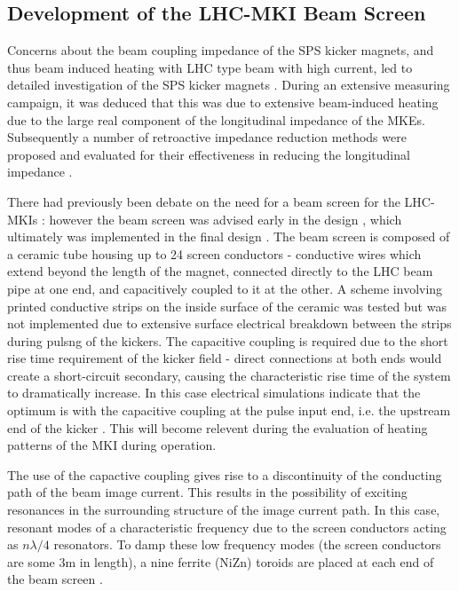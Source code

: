 \subsection{Development of the LHC-MKI Beam Screen}
\label{sec:mki-screen-development}

Concerns about the beam coupling impedance of the SPS kicker magnets, and thus beam induced heating with LHC type beam with high current, led to detailed investigation of the SPS kicker magnets \cite{Arduini:beamInducedSPS}. During an extensive measuring campaign, it was deduced that this was due to extensive beam-induced heating due to the large real component of the longitudinal impedance of the MKEs. Subsequently a number of retroactive impedance reduction methods were proposed and evaluated for their effectiveness in reducing the longitudinal impedance \cite{Kroyer:MKEReduct}.

There had previously been debate on the need for a beam screen for the LHC-MKIs \cite{Vos:beamScreen}: however the beam screen was advised early in the design \cite{Ducimetiere:designMKI}, which ultimately was implemented in the final design \cite{Barnes:improvBeamScreen}. The beam screen is composed of a ceramic tube housing up to 24 screen conductors - conductive wires which extend beyond the length of the magnet, connected directly to the LHC beam pipe at one end, and capacitively coupled to it at the other. A scheme involving printed conductive strips on the inside surface of the ceramic was tested but was not implemented due to extensive surface electrical breakdown between the strips during pulsng of the kickers. The capacitive coupling is required due to the short rise time requirement of the kicker field - direct connections at both ends would create a short-circuit secondary, causing the characteristic rise time of the system to dramatically increase. In this case electrical simulations indicate that the optimum is with the capacitive coupling at the pulse input end, i.e. the upstream end of the kicker \cite{Barnes:improvBeamScreen}. This will become relevent during the evaluation of heating patterns of the MKI during operation.

The use of the capactive coupling gives rise to a discontinuity of the conducting path of the beam image current. This results in the possibility of exciting resonances in the surrounding structure of the image current path. In this case, resonant modes of a characteristic frequency due to the screen conductors acting as $n \lambda /4$ resonators. To damp these low frequency modes (the screen conductors are some 3m in length), a nine ferrite (NiZn) toroids are placed at each end of the beam screen \cite{Caspers:impMeasMKI, Caspera:impMeasLowFreqMKI, Barnes:mkiVacTemp}. 

